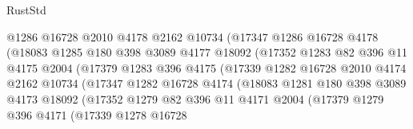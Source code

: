 \begin{lexlean}{RustStd}
\begin{coremodule}
                            @1286
                            @16728
                            @2010
                            @4178
                            @2162
                            @10734
                            (@17347
                              @1286
                              @16728
                              @4178
                              (@18083
                                @1285
                                @180
                                @398
                                @3089
                                @4177
                                @18092
                                (@17352
                                  @1283
                                  @82
                                  @396
                                  @11
                                  @4175
                                  @2004
                                  (@17379
                                    @1283
                                    @396
                                    @4175
                                    (@17339
                                      @1282
                                      @16728
                                      @2010
                                      @4174
                                      @2162
                                      @10734
                                      (@17347
                                        @1282
                                        @16728
                                        @4174
                                        (@18083
                                          @1281
                                          @180
                                          @398
                                          @3089
                                          @4173
                                          @18092
                                          (@17352
                                            @1279
                                            @82
                                            @396
                                            @11
                                            @4171
                                            @2004
                                            (@17379
                                              @1279
                                              @396
                                              @4171
                                              (@17339
                                                @1278
                                                @16728

\end{coremodule}
\end{lexlean}
